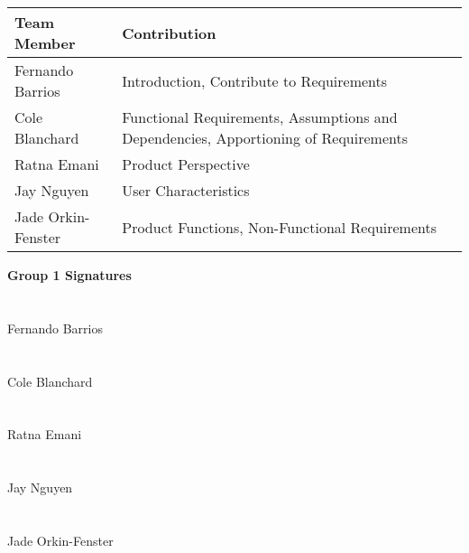\documentclass[12pt,letterpaper]{article}
\begin{document}
\begin{center}
\begin{tabularx}{\textwidth}{|l|X|}
\hline
\textbf{Team Member} & \textbf{Contribution}\\ 
\hline
 Fernando Barrios & Introduction, Contribute to Requirements \\  
\hline
 Cole Blanchard & Functional Requirements, Assumptions and Dependencies, Apportioning of Requirements\\
\hline
 Ratna Emani & Product Perspective \\
\hline
 Jay Nguyen & User Characteristics \\  
\hline
 Jade Orkin-Fenster & Product Functions, Non-Functional Requirements\\
\hline

\end{tabularx}
\end{center}


\large\textbf{Group 1 Signatures}\\ \\ \\

Fernando Barrios\\ \\ \\
		
Cole Blanchard\\ \\ \\

Ratna Emani\\ \\ \\
		
Jay Nguyen\\ \\ \\
		
Jade Orkin-Fenster\\
\end{document}
